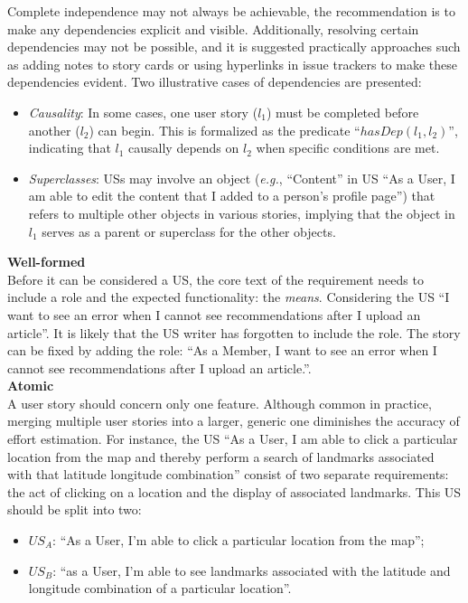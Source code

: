 Complete independence may not always be achievable, the recommendation is to make any dependencies explicit and visible. Additionally, resolving certain dependencies may not be possible, and it is suggested practically approaches such as adding notes to story cards or using hyperlinks in issue trackers to make these dependencies evident. Two illustrative cases of dependencies are presented:
\begin{itemize}
\item 	\emph{Causality}: In some cases, one user story ($l_1$) must be completed before another ($l_2$) can begin. This is formalized as the predicate \enquote{$hasDep(l_1, l_2)$}, indicating that $ l_1$ causally depends on $l_2$ when specific conditions are met.
\item 	\emph{Superclasses}: USs may involve an object (\emph{e.g.}, \enquote{Content} in US \enquote{As a User, I am able to edit the content that I added to a person’s profile page}) that refers to multiple other objects in various stories, implying that the object in $l_1$ serves as a parent or superclass for the other objects.
\end{itemize}
\textbf{Well-formed}\\ 
Before it can be considered a US, the core text of the requirement needs to include a role and the expected functionality: the \emph{means}. Considering the US \enquote{I want to see an error when I cannot see recommendations after I upload an article}. It is likely that the US writer has forgotten to include the role. The story can be fixed by adding the role: \enquote{As a Member, I want to see an error when I cannot see recommendations after I upload an article.}.\\ 
\textbf{Atomic}\\ 
A user story should concern only one feature. Although common in practice, merging multiple user stories into a larger, generic one diminishes the accuracy of effort estimation\cite{liskin2014we}. For instance, the US \enquote{As a User, I am able to click a particular location from the map and thereby perform a search of landmarks associated with that latitude longitude combination} consist of two separate requirements: the act of clicking on a location and the display of associated landmarks. This US should be split into two:
\begin{itemize}
\item $US_A$: \enquote{As a User, I’m able to click a particular location from the map};
\item $US_B$: \enquote{as a User, I’m able to see landmarks associated with the latitude and longitude combination of a particular location}.
\end{itemize}
